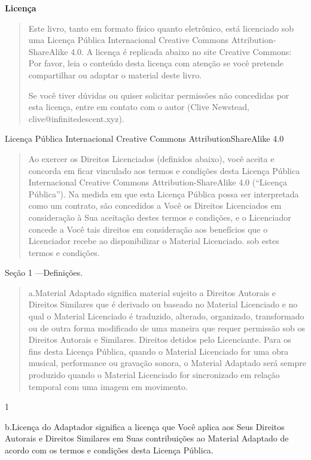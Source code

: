 \documentclass[
]{article}
\author{}
\date{}
\begin{document}
\textbf{Licença}

\begin{quote}
Este livro, tanto em formato físico quanto eletrônico, está licenciado
sob uma Licença Pública Internacional Creative Commons
Attribution-ShareAlike 4.0. A licença é replicada abaixo no site
Creative Commons: Por favor, leia o conteúdo desta licença com atenção
se você pretende compartilhar ou adaptar o material deste livro.

Se você tiver dúvidas ou quiser solicitar permissões não concedidas por
esta licença, entre em contato com o autor (Clive Newstead,
clive@infinitedescent.xyz).
\end{quote}

Licença Pública Internacional Creative Commons AttributionShareAlike 4.0

\begin{quote}
Ao exercer os Direitos Licenciados (definidos abaixo), você aceita e
concorda em ficar vinculado aos termos e condições desta Licença Pública
Internacional Creative Commons Attribution-ShareAlike 4.0 (``Licença
Pública''). Na medida em que esta Licença Pública possa ser interpretada
como um contrato, são concedidos a Você os Direitos Licenciados em
consideração à Sua aceitação destes termos e condições, e o Licenciador
concede a Você tais direitos em consideração aos benefícios que o
Licenciador recebe ao disponibilizar o Material Licenciado. sob estes
termos e condições.
\end{quote}

Seção 1 ---Definições.

\begin{quote}
a.Material Adaptado significa material sujeito a Direitos Autorais e
Direitos Similares que é derivado ou baseado no Material Licenciado e no
qual o Material Licenciado é traduzido, alterado, organizado,
transformado ou de outra forma modificado de uma maneira que requer
permissão sob os Direitos Autorais e Similares. Direitos detidos pelo
Licenciante. Para os fins desta Licença Pública, quando o Material
Licenciado for uma obra musical, performance ou gravação sonora, o
Material Adaptado será sempre produzido quando o Material Licenciado for
sincronizado em relação temporal com uma imagem em movimento.
\end{quote}

1

b.Licença do Adaptador significa a licença que Você aplica aos Seus
Direitos Autorais e Direitos Similares em Suas contribuições ao Material
Adaptado de acordo com os termos e condições desta Licença Pública.
\end{document}
